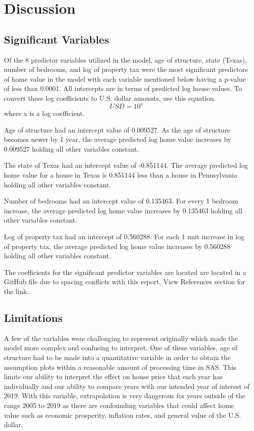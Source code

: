\section{Discussion}
\label{sec:disc}

\subsection{Significant Variables}
Of the 8 predictor variables utilized in the model, age of structure, state (Texas), number of bedrooms, and log of property tax were the most significant predictors of home value in the model with each variable mentioned below having a p-value of less than 0.0001. All intercepts are in terms of predicted log house values. To convert these log coefficients to U.S. dollar amounts, use this equation. \[ USD=10^x \] where x is a log coefficient.

Age of structure had an intercept value of 0.009527. As the age of structure becomes newer by 1 year, the average predicted log home value increases by 0.009527 holding all other variables constant.

The state of Texas had an intercept value of -0.851144. The average predicted log home value for a house in Texas is 0.851144 less than a house in Pennsylvania holding all other variables constant.

Number of bedrooms had an intercept value of 0.135463. For every 1 bedroom increase, the average predicted log home value increases by 0.135463 holding all other variables constant.

Log of property tax had an intercept of 0.560288. For each 1 unit increase in log of property tax, the average predicted log home value increases by 0.560288 holding all other variables constant.

The coefficients for the significant predictor variables are located are located in a GitHub file due to spacing conflicts with this report. View References section for the link.\cite{github}.

\subsection{Limitations}
A few of the variables were challenging to represent originally which made the model more complex and confusing to interpret. One of these variables, age of structure had to be made into a quantitative variable in order to obtain the assumption plots within a reasonable amount of processing time in SAS. This limits our ability to interpret the effect on house price that each year has individually and our ability to compare years with our intended year of interest of 2019. With this variable, extrapolation is very dangerous for years outside of the range 2005 to 2019 as there are confounding variables that could affect home value such as economic prosperity, inflation rates, and general value of the U.S. dollar.

